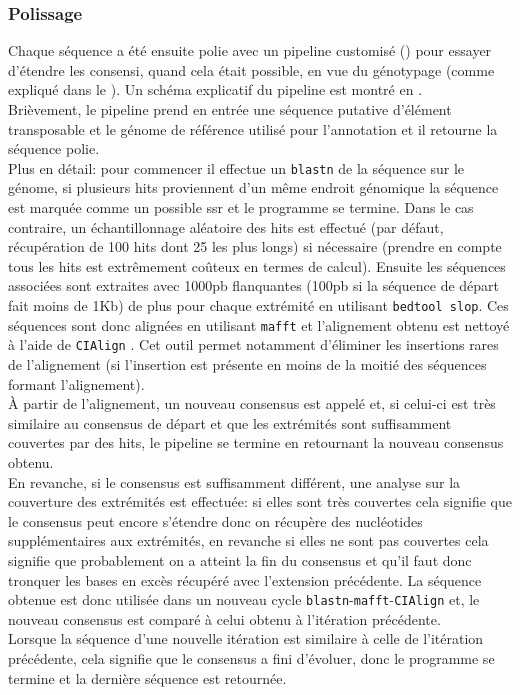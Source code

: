 \documentclass[10pt]{article}
\begin{document}
\subsubsection{Polissage}\label{sec:polish}

Chaque séquence a été ensuite polie avec un pipeline customisé (\linkautorefname{\ref{link4}}) pour essayer d'étendre les consensi, quand cela était possible, en vue du génotypage (comme expliqué dans le ). Un schéma explicatif du pipeline est montré en \figureautorefname{ \ref{fig:polishte}}. \\
Brièvement, le pipeline prend en entrée une séquence putative d'élément transposable et le génome de référence utilisé pour l'annotation et il retourne la séquence polie. \\
Plus en détail: pour commencer il effectue un \texttt{blastn} \cite{camacho_blast_2009} de la séquence sur le génome, si plusieurs hits proviennent d'un même endroit génomique la séquence est marquée comme un possible \acrfull{ssr} et le programme se termine. Dans le cas contraire, un échantillonnage aléatoire des hits est effectué (par défaut, récupération de 100 hits dont 25 les plus longs) si nécessaire (prendre en compte tous les hits est extrêmement coûteux en termes de calcul). Ensuite les séquences associées sont extraites avec 1000pb flanquantes (100pb si la séquence de départ fait moins de 1Kb) de plus pour chaque extrémité en utilisant \texttt{bedtool slop}. Ces séquences sont donc alignées en utilisant \texttt{mafft} \cite{katoh_mafft_2002} et l'alignement obtenu est nettoyé à l'aide de \texttt{CIAlign} \cite{tumescheit_cialign_2022}. Cet outil permet notamment d'éliminer les \og insertions \fg{} rares de l'alignement (si l'insertion est présente en moins de la moitié des séquences formant l'alignement).  \\
\`A partir de l'alignement, un nouveau consensus est appelé et, si celui-ci est très similaire au consensus de départ et que les extrémités sont suffisamment couvertes par des hits, le pipeline se termine en retournant la nouveau consensus obtenu. \\
En revanche, si le consensus est suffisamment différent, une analyse sur la couverture des extrémités est effectuée: si elles sont très couvertes cela signifie que le consensus peut encore s'étendre donc on récupère des nucléotides supplémentaires aux extrémités, en revanche si elles ne sont pas couvertes cela signifie que probablement on a atteint la fin du consensus et qu'il faut donc tronquer les bases en excès récupéré avec l'extension précédente. La séquence obtenue est donc utilisée dans un nouveau cycle \texttt{blastn}-\texttt{mafft}-\texttt{CIAlign} et, le nouveau consensus est comparé à celui obtenu à l'itération précédente. \\
Lorsque la séquence d'une nouvelle itération est similaire à celle de l'itération précédente, cela signifie que le consensus a fini d'évoluer, donc le programme se termine et la dernière séquence est retournée. \\
\end{document}
